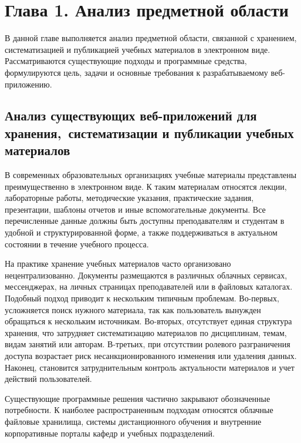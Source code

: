 \section*{Глава 1. Анализ предметной области}

В данной главе выполняется анализ предметной области, связанной с хранением, систематизацией и публикацией учебных материалов в электронном виде. Рассматриваются существующие подходы и программные средства, формулируются цель, задачи и основные требования к разрабатываемому веб-приложению.

\subsection{Анализ существующих веб-приложений для хранения,\ систематизации и публикации учебных материалов}

В современных образовательных организациях учебные материалы представлены преимущественно в электронном виде. К таким материалам относятся лекции, лабораторные работы, методические указания, практические задания, презентации, шаблоны отчетов и иные вспомогательные документы. Все перечисленные данные должны быть доступны преподавателям и студентам в удобной и структурированной форме, а также поддерживаться в актуальном состоянии в течение учебного процесса.

На практике хранение учебных материалов часто организовано нецентрализованно. Документы размещаются в различных облачных сервисах, мессенджерах, на личных страницах преподавателей или в файловых каталогах. Подобный подход приводит к нескольким типичным проблемам. Во-первых, усложняется поиск нужного материала, так как пользователь вынужден обращаться к нескольким источникам. Во-вторых, отсутствует единая структура хранения, что затрудняет систематизацию материалов по дисциплинам, темам, видам занятий или авторам. В-третьих, при отсутствии ролевого разграничения доступа возрастает риск несанкционированного изменения или удаления данных. Наконец, становится затруднительным контроль актуальности материалов и учет действий пользователей.

Существующие программные решения частично закрывают обозначенные потребности. К наиболее распространенным подходам относятся облачные файловые хранилища, системы дистанционного обучения и внутренние корпоративные порталы кафедр и учебных подразделений.

